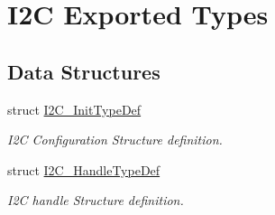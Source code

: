 \hypertarget{group___i2_c___exported___types}{}\section{I2C Exported Types}
\label{group___i2_c___exported___types}
\subsection*{Data Structures}
\begin{DoxyCompactItemize}
\item 
struct \mbox{\hyperlink{struct_i2_c___init_type_def}{I2\+C\+\_\+\+Init\+Type\+Def}}
\begin{DoxyCompactList}\small\item\em I2C Configuration Structure definition. \end{DoxyCompactList}\item 
struct \mbox{\hyperlink{struct_i2_c___handle_type_def}{I2\+C\+\_\+\+Handle\+Type\+Def}}
\begin{DoxyCompactList}\small\item\em I2C handle Structure definition. \end{DoxyCompactList}\end{DoxyCompactItemize}
